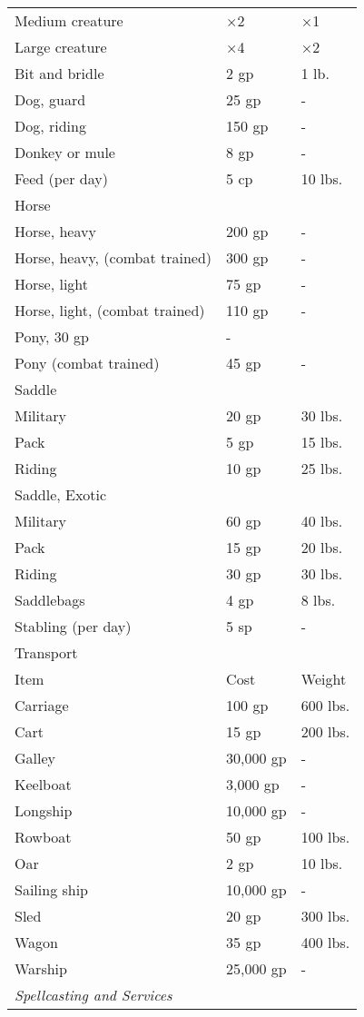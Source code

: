 \begin{table}[]
\begin{tabular}{lll}
 Medium creature & ×2 & ×1 \\
 Large creature & ×4 & ×2 \\
 Bit and bridle & 2 gp & 1 lb. \\
 Dog, guard & 25 gp & - \\
 Dog, riding & 150 gp & - \\
 Donkey or mule & 8 gp & - \\
 Feed (per day) & 5 cp & 10 lbs. \\
 Horse  \\
 Horse, heavy & 200 gp & - \\
 Horse, heavy, (combat trained) & 300 gp & - \\
 Horse, light & 75 gp & - \\
 Horse, light, (combat trained) & 110 gp & - \\
 Pony, 30 gp & - \\
 Pony (combat trained) & 45 gp & - \\
 Saddle \\
 Military & 20 gp & 30 lbs. \\
 Pack & 5 gp & 15 lbs. \\
 Riding & 10 gp & 25 lbs. \\
 Saddle, Exotic  \\
 Military & 60 gp & 40 lbs. \\
 Pack & 15 gp & 20 lbs. \\
 Riding & 30 gp & 30 lbs. \\
 Saddlebags & 4 gp & 8 lbs. \\
 Stabling (per day) & 5 sp & -\\
Transport  \\
 Item & Cost & Weight\\
Carriage & 100 gp & 600 lbs. \\
 Cart & 15 gp & 200 lbs. \\
 Galley & 30,000 gp & - \\
 Keelboat & 3,000 gp & - \\
 Longship & 10,000 gp & - \\
 Rowboat & 50 gp & 100 lbs. \\
 Oar & 2 gp & 10 lbs. \\
 Sailing ship & 10,000 gp & - \\
 Sled & 20 gp & 300 lbs. \\
 Wagon & 35 gp & 400 lbs. \\
 Warship & 25,000 gp & -\\
\textit{Spellcasting and Services} \\

\end{tabular}
\end{table}
